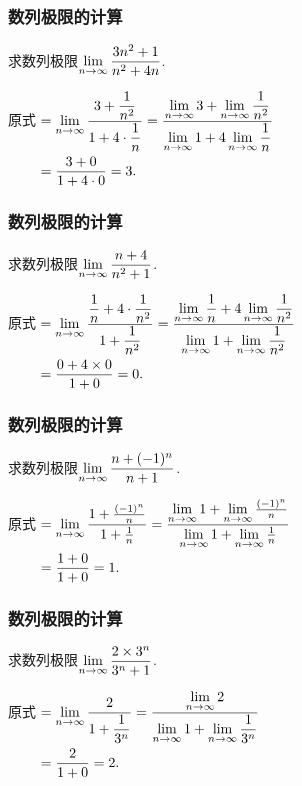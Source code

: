 \documentclass[14pt,notheorems,leqno,xcolor={rgb}]{beamer} %
\begin{document}
\begin{frame}
\frametitle{数列极限的计算}
\begin{example}
求数列极限$\lim\limits_{n\to\infty}\dfrac{3n^2+1}{n^2+4n}$.
\end{example}
\pause
\begin{solution}
原式\unskip$\begin{aligned}[t]
&=\lim\limits_{n\to\infty}\dfrac{3+\dfrac1{n^2}}{1+4\cdot\dfrac1n}
 =\dfrac{\lim\limits_{n\to\infty}3+\lim\limits_{n\to\infty}\dfrac1{n^2}}{\lim\limits_{n\to\infty}1+4\lim\limits_{n\to\infty}\dfrac1n}\\
&=\dfrac{3+0}{1+4\cdot0}=3.
\end{aligned}$
\end{solution}
\end{frame}

\begin{frame}
\frametitle{数列极限的计算}
\begin{example}
求数列极限$\lim\limits_{n\to\infty}\dfrac{n+4}{n^2+1}$.
\end{example}
\pause
\begin{solution}
原式\unskip$\begin{aligned}[t]
&=\lim\limits_{n\to\infty}\dfrac{\dfrac1n+4\cdot\dfrac1{n^2}}{1+\dfrac1{n^2}}
 =\dfrac{\lim\limits_{n\to\infty}\dfrac1n+4\lim\limits_{n\to\infty}\dfrac1{n^2}}{\lim\limits_{n\to\infty}1+\lim\limits_{n\to\infty}\dfrac1{n^2}}\\
&=\dfrac{0+4\times0}{1+0}=0.
\end{aligned}$
\end{solution}
\end{frame}

\begin{frame}
\frametitle{数列极限的计算}
\begin{example}
求数列极限$\lim\limits_{n\to\infty}\dfrac{n+(-1)^n}{n+1}$.
\end{example}
\pause
\begin{solution}
原式\unskip$\begin{aligned}[t]
&=\lim\limits_{n\to\infty}\dfrac{1+\frac{(-1)^n}{n}}{1+\frac1n}
 =\dfrac{\lim\limits_{n\to\infty}1+\lim\limits_{n\to\infty}\frac{(-1)^n}{n}}{\lim\limits_{n\to\infty}1+\lim\limits_{n\to\infty}\frac1n}\\
&=\frac{1+0}{1+0}=1.
\end{aligned}$
\end{solution}
\end{frame}

\begin{frame}
\frametitle{数列极限的计算}
\begin{example}
求数列极限$\lim\limits_{n\to\infty}\dfrac{2\times 3^n}{3^n+1}$.
\end{example}
\pause
\begin{solution}
原式$\begin{aligned}[t]
&=\lim\limits_{n\to\infty}\dfrac{2}{1+\dfrac1{3^n}}
 =\dfrac{\lim\limits_{n\to\infty}2}{\lim\limits_{n\to\infty}1+\lim\limits_{n\to\infty}\dfrac1{3^n}}\\
&=\frac{2}{1+0}=2.
\end{aligned}$
\end{solution}
\end{frame}
\end{document}
